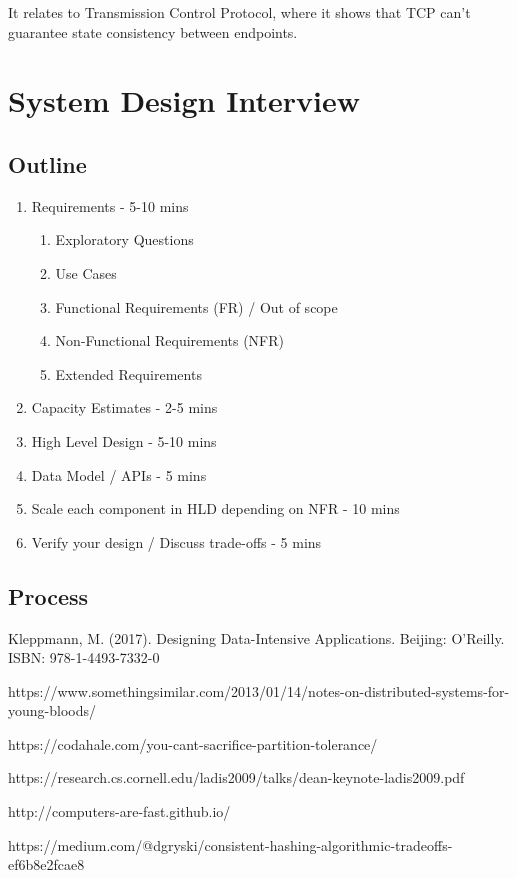 \documentclass{article}
\begin{document}
    It relates to Transmission Control Protocol, where it shows that TCP can't guarantee state consistency between endpoints.

\newpage
\section{System Design Interview}
\subsection{Outline}
\begin{enumerate}
    \item Requirements - 5-10 mins
    \begin{enumerate}
        \item Exploratory Questions
        \item Use Cases
        \item Functional Requirements (FR) / Out of scope 
        \item Non-Functional Requirements (NFR)
        \item Extended Requirements
    \end{enumerate}
    \item Capacity Estimates - 2-5 mins
    \item High Level Design - 5-10 mins
    \item Data Model / APIs - 5 mins
    \item Scale each component in HLD depending on NFR - 10 mins
    \item Verify your design / Discuss trade-offs - 5 mins
\end{enumerate}

\subsection{Process}

\newpage
\begin{thebibliography}{}
Kleppmann, M. (2017). Designing Data-Intensive Applications. Beijing: O'Reilly. ISBN: 978-1-4493-7332-0

https://www.somethingsimilar.com/2013/01/14/notes-on-distributed-systems-for-young-bloods/

https://codahale.com/you-cant-sacrifice-partition-tolerance/


https://research.cs.cornell.edu/ladis2009/talks/dean-keynote-ladis2009.pdf

http://computers-are-fast.github.io/

https://medium.com/@dgryski/consistent-hashing-algorithmic-tradeoffs-ef6b8e2fcae8

\end{thebibliography}
\end{document}
